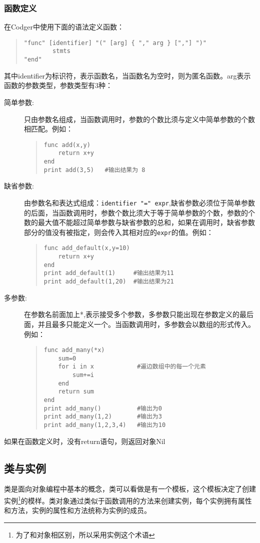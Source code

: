 \subsubsection{函数定义}
在Codger中使用下面的语法定义函数：
\begin{quote}
\begin{verbatim}
"func" [identifier] "(" [arg] { "," arg } [","] ")"
        stmts
"end"
\end{verbatim}
\end{quote}
其中identifier为标识符，表示函数名，当函数名为空时，则为匿名函数。arg表示函数的参数类型，参数类型有3种：
\begin{description}
\item[简单参数:]只由参数名组成，当函数调用时，参数的个数比须与定义中简单参数的个数相匹配。例如：
\begin{quote}
\begin{verbatim}
func add(x,y)
    return x+y
end 
print add(3,5)   #输出结果为 8
\end{verbatim}
\end{quote}

\item[缺省参数:]由参数名和表达式组成：\verb|identifier "=" expr|,缺省参数必须位于简单参数的后面，当函数调用时，参数个数比须大于等于简单参数的个数，参数的个数的最大值不能超过简单参数与缺省参数的总和，如果在调用时，缺省参数部分的值没有被指定，则会传入其相对应的\verb|expr|的值。例如：
\begin{quote}
\begin{verbatim}
func add_default(x,y=10)
    return x+y
end 
print add_default(1)     #输出结果为11
print add_default(1,20)  #输出结果为21
\end{verbatim}
\end{quote}
\item[多参数:]在参数名前面加上*,表示接受多个参数，多参数只能出现在参数定义的最后面，并且最多只能定义一个。当函数调用时，多参数会以数组的形式传入。例如：
\begin{quote}
\begin{verbatim}
func add_many(*x)
    sum=0
    for i in x            #遍边数组中的每一个元素
        sum+=i
    end
    return sum
end
print add_many()          #输出为0
print add_many(1,2)       #输出为3
print add_many(1,2,3,4)   #输出为10
\end{verbatim}
\end{quote}
\end{description}
如果在函数定义时，没有return语句，则返回对象Nil
\subsection{类与实例}
类是面向对象编程中基本的概念，类可以看做是有一个模板，这个模板决定了创建实例\footnote{为了和对象相区别，所以采用实例这个术语}的模样。类对象通过类似于函数调用的方法来创建实例，每个实例拥有属性和方法，实例的属性和方法统称为实例的成员。

